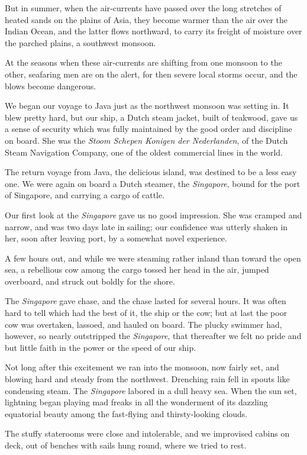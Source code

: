 \documentclass[12pt]{book}
\begin{document}
But in summer, when the air‐currents have passed over the long stretches of
heated sands on the plains of Asia, they become warmer than the air over the
Indian Ocean, and the latter flows northward, to carry its freight of moisture over
the parched plains, a southwest monsoon.

At the seasons when these air‐currents are shifting from one monsoon to the
other, seafaring men are on the alert, for then severe local storms occur, and the
blows become dangerous.

We began our voyage to Java just as the northwest monsoon was setting in. It
blew pretty hard, but our ship, a Dutch steam jacket, built of teakwood, gave us a
sense of security which was fully maintained by the good order and discipline on
board. She was the {\it Stoom Schepen Konigen der Nederlanden}, of the Dutch Steam
Navigation Company, one of the oldest commercial lines in the world.

The return voyage from Java, the delicious island, was destined to be a less
easy one. We were again on board a Dutch steamer, the {\it Singapore}, bound for the
port of Singapore, and carrying a cargo of cattle.

Our first look at the {\it Singapore} gave us no good impression. She was cramped
and narrow, and was two days late in sailing; our confidence was utterly shaken
in her, soon after leaving port, by a somewhat novel experience.

A few hours out, and while we were steaming rather inland than toward the
open sea, a rebellious cow among the cargo tossed her head in the air, jumped
overboard, and struck out boldly for the shore.

The {\it Singapore} gave chase, and the chase lasted for several hours. It was often
hard to tell which had the best of it, the ship or the cow; but at last the poor cow
was overtaken, lassoed, and hauled on board. The plucky swimmer had, however,
so nearly outstripped the {\it Singapore}, that thereafter we felt no pride and but little
faith in the power or the speed of our ship.

Not long after this excitement we ran into the monsoon, now fairly set, and
blowing hard and steady from the northwest. Drenching rain fell in spouts like
condensing steam. The {\it Singapore} labored in a dull heavy sea. When the sun
set, lightning began playing mad freaks in all the wonderment of its dazzling
equatorial beauty among the fast‐flying and thirsty‐looking clouds.

The stuffy staterooms were close and intolerable, and we improvised cabins
on deck, out of benches with sails hung round, where we tried to rest.
\end{document}
